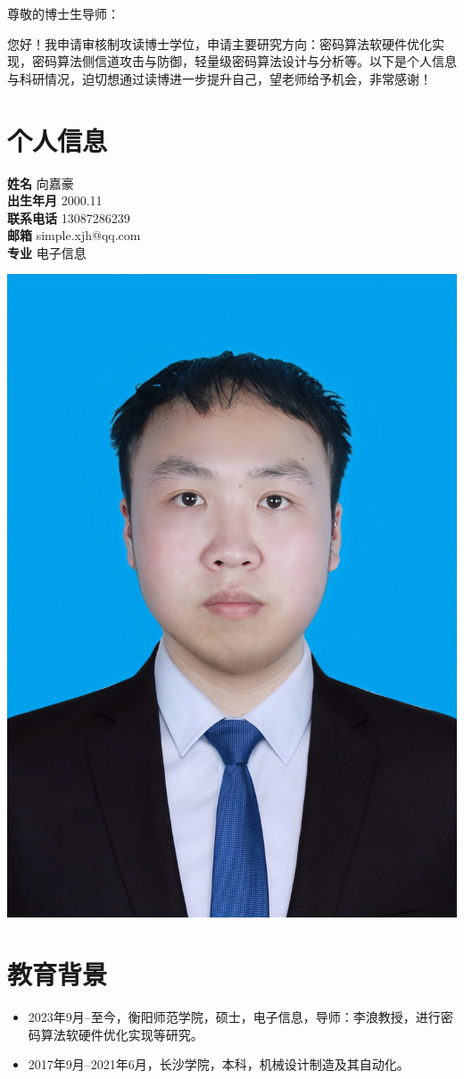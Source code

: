 \documentclass[12pt,a4paper]{article}
\newcommand{\ResumeItem}[2]{\noindent\textbf{#1} \hfill {\small #2}\\}
\begin{document}
{
  \noindent
  尊敬的博士生导师：

  您好！我申请审核制攻读博士学位，申请主要研究方向：密码算法软硬件优化实现，密码算法侧信道攻击与防御，轻量级密码算法设计与分析等。以下是个人信息与科研情况，迫切想通过读博进一步提升自己，望老师给予机会，非常感谢！
  \vspace{1em}
  \normalsize
}

\section*{个人信息}

\begin{center}
  \begin{minipage}[t]{0.63\textwidth}
    \vspace{0pt} %
    \centering
    \ResumeItem{姓名}{向嘉豪}
    \ResumeItem{出生年月}{2000.11}
    \ResumeItem{联系电话}{13087286239}
    \ResumeItem{邮箱}{simple.xjh@qq.com}
    \ResumeItem{专业}{电子信息}
  \end{minipage}%
  \hspace{1em}
  \begin{minipage}[t]{0.33\textwidth}
    \vspace{0pt} %
    \hspace{7em}
    \includegraphics[width=0.4\linewidth]{../image.jpg}
  \end{minipage}
\end{center}

\section*{教育背景}
{
  \begin{itemize}[leftmargin=2em]
    \item 2023年9月--至今，衡阳师范学院，硕士，电子信息，导师：李浪教授，进行密码算法软硬件优化实现等研究。
    \item 2017年9月--2021年6月，长沙学院，本科，机械设计制造及其自动化。
  \end{itemize}

}
\end{document}
